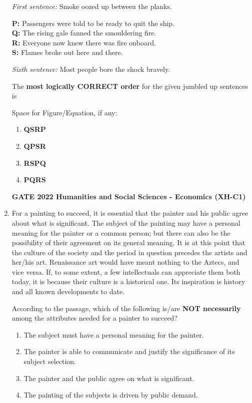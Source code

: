 \documentclass[journal,12pt,onecolumn]{exam}
\theoremstyle{remark}
\begin{document}
\begin{enumerate}
\textit{First sentence:} Smoke oozed up between the planks.

\textbf{P:} Passengers were told to be ready to quit the ship.\\
\textbf{Q:} The rising gale fanned the smouldering fire.\\
\textbf{R:} Everyone now knew there was fire onboard.\\
\textbf{S:} Flames broke out here and there.

\textit{Sixth sentence:} Most people bore the shock bravely.

The \textbf{most logically CORRECT order} for the given jumbled up sentences is

\vspace{0.2cm}
Space for Figure/Equation, if any:
\begin{enumerate}
  \item \textbf{QSRP}
  \item \textbf{QPSR}
  \item \textbf{RSPQ}
  \item \textbf{PQRS}
\end{enumerate}
\textbf{GATE 2022 Humanities and Social Sciences - Economics (XH-C1)}
 \item For a painting to succeed, it is essential that the painter and his public agree about what is significant. The subject of the painting may have a personal meaning for the painter or a common person; but there can also be the possibility of their agreement on its general meaning. It is at this point that the culture of the society and the period in question precedes the artists and her/his art. Renaissance art would have meant nothing to the Aztecs, and vice versa. If, to some extent, a few intellectuals can appreciate them both today, it is because their culture is a historical one. Its inspiration is history and all known developments to date.

According to the passage, which of the following is/are \textbf{NOT necessarily} among the attributes needed for a painter to succeed?

\vspace{0.2cm}

\begin{enumerate}
  \item The subject must have a personal meaning for the painter.
  \item The painter is able to communicate and justify the significance of its subject selection.
  \item The painter and the public agree on what is significant.
  \item The painting of the subjects is driven by public demand.
\end{enumerate}


\end{enumerate}
\end{document}
